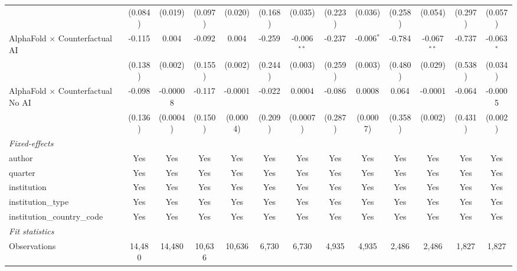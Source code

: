 \begin{tabular}{lcccccccccccc}
                                            & (0.084)      & (0.019)  & (0.097) & (0.020)  & (0.168)      & (0.035)       & (0.223)     & (0.036)      & (0.258) & (0.054)       & (0.297) & (0.057)\\   
   AlphaFold $\times$ Counterfactual AI     & -0.115       & 0.004    & -0.092  & 0.004    & -0.259       & -0.006$^{**}$ & -0.237      & -0.006$^{*}$ & -0.784  & -0.067$^{**}$ & -0.737  & -0.063$^{*}$\\   
                                            & (0.138)      & (0.002)  & (0.155) & (0.002)  & (0.244)      & (0.003)       & (0.259)     & (0.003)      & (0.480) & (0.029)       & (0.538) & (0.034)\\   
   AlphaFold $\times$ Counterfactual No AI  & -0.098       & -0.00008 & -0.117  & -0.0001  & -0.022       & 0.0004        & -0.086      & 0.0008       & 0.064   & -0.0001       & -0.064  & -0.0005\\   
                                            & (0.136)      & (0.0004) & (0.150) & (0.0004) & (0.209)      & (0.0007)      & (0.287)     & (0.0007)     & (0.358) & (0.002)       & (0.431) & (0.002)\\   
   \midrule
   \emph{Fixed-effects}\\
   author                                   & Yes          & Yes      & Yes     & Yes      & Yes          & Yes           & Yes         & Yes          & Yes     & Yes           & Yes     & Yes\\  
   quarter                                  & Yes          & Yes      & Yes     & Yes      & Yes          & Yes           & Yes         & Yes          & Yes     & Yes           & Yes     & Yes\\  
   institution                              & Yes          & Yes      & Yes     & Yes      & Yes          & Yes           & Yes         & Yes          & Yes     & Yes           & Yes     & Yes\\  
   institution\_type                        & Yes          & Yes      & Yes     & Yes      & Yes          & Yes           & Yes         & Yes          & Yes     & Yes           & Yes     & Yes\\  
   institution\_country\_code               & Yes          & Yes      & Yes     & Yes      & Yes          & Yes           & Yes         & Yes          & Yes     & Yes           & Yes     & Yes\\  
   \midrule
   \emph{Fit statistics}\\
   Observations                             & 14,480       & 14,480   & 10,636  & 10,636   & 6,730        & 6,730         & 4,935       & 4,935        & 2,486   & 2,486         & 1,827   & 1,827\\  

\end{tabular}
